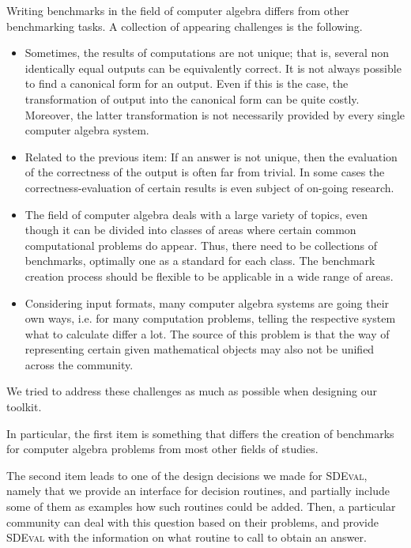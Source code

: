 \documentclass[oribibl,11pt]{article}
\begin{document}
Writing benchmarks in the field of computer algebra differs from other
benchmarking tasks. A collection of appearing challenges is the
following.
\begin{itemize}

  \item Sometimes, the results of computations are not unique; that
    is, several non identically equal outputs can be equivalently correct. It is
    not always possible to find a canonical form for an output. Even
    if this is the case, the transformation of output into the
    canonical form can be quite costly. Moreover, the latter
    transformation is not necessarily provided by every single
    computer algebra system.
  \item Related to the previous item: If an answer is not unique, then
    the evaluation of the correctness of the output is often far from
    trivial. In some cases the correctness-evaluation of certain results is even subject of on-going research.
  \item The field of computer algebra deals with a large variety of
    topics, even though it can be divided into classes of areas where
    certain common computational problems do appear. Thus, there need
    to be collections of benchmarks, optimally one as a standard for
    each class. The benchmark creation process should be flexible to
    be applicable in a wide range of areas.
  \item Considering input formats, many computer algebra systems are
    going their own ways, i.e. for many computation problems, telling the respective system what to calculate differ a
    lot. The source of this problem is that the way of representing
    certain given mathematical objects may also not be unified across the community.
\end{itemize}
We tried to address these challenges as much as possible when
designing our toolkit.

In particular, the first item is something that differs the creation
of benchmarks for computer algebra problems from most other fields of
studies.

The second item leads to one of the design decisions we made for
\textsc{SDEval}, namely that we provide an interface for decision
routines, %
and partially include some of them as examples how such routines could be added. 
Then, a particular community can deal with this
question based on their problems, and provide \textsc{SDEval} with the
information on what routine to call to obtain an answer.
\end{document}
